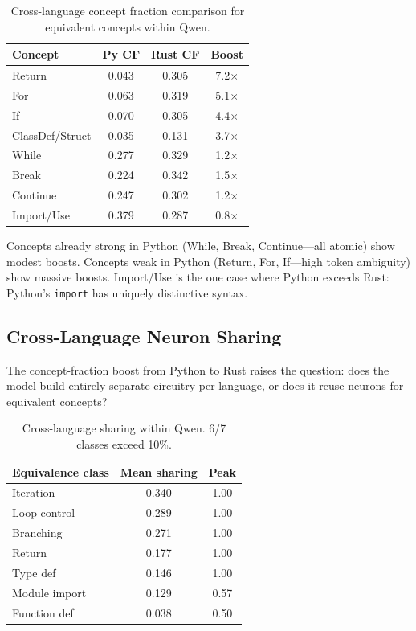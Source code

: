\documentclass[11pt]{article}
\begin{document}
\begin{table}[h]
\centering
\small
\begin{tabular}{lccc}
\toprule
Concept & Py CF & Rust CF & Boost \\
\midrule
Return  & 0.043 & 0.305 & 7.2$\times$ \\
For     & 0.063 & 0.319 & 5.1$\times$ \\
If      & 0.070 & 0.305 & 4.4$\times$ \\
ClassDef/Struct & 0.035 & 0.131 & 3.7$\times$ \\
While   & 0.277 & 0.329 & 1.2$\times$ \\
Break   & 0.224 & 0.342 & 1.5$\times$ \\
Continue & 0.247 & 0.302 & 1.2$\times$ \\
Import/Use & 0.379 & 0.287 & 0.8$\times$ \\
\bottomrule
\end{tabular}
\caption{Cross-language concept fraction comparison for equivalent concepts within Qwen.}
\label{tab:boost}
\end{table}

Concepts already strong in Python (While, Break, Continue---all atomic) show modest boosts. Concepts weak in Python (Return, For, If---high token ambiguity) show massive boosts. Import/Use is the one case where Python exceeds Rust: Python's \texttt{import} has uniquely distinctive syntax.

\subsection{Cross-Language Neuron Sharing}

The concept-fraction boost from Python to Rust raises the question: does the model build entirely separate circuitry per language, or does it reuse neurons for equivalent concepts?

\begin{table}[h]
\centering
\small
\begin{tabular}{lcc}
\toprule
Equivalence class & Mean sharing & Peak \\
\midrule
Iteration         & 0.340 & 1.00 \\
Loop control      & 0.289 & 1.00 \\
Branching         & 0.271 & 1.00 \\
Return            & 0.177 & 1.00 \\
Type def          & 0.146 & 1.00 \\
Module import     & 0.129 & 0.57 \\
Function def      & 0.038 & 0.50 \\
\bottomrule
\end{tabular}
\caption{Cross-language sharing within Qwen. 6/7 classes exceed 10\%.}
\label{tab:e7}
\end{table}
\end{document}
